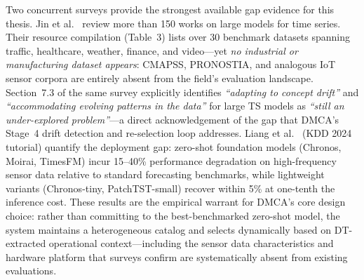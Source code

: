 Two concurrent surveys provide the strongest available gap evidence for
this thesis.
Jin et al.~\cite{jin2023surveyts} review more than 150 works on large
models for time series. Their resource compilation (Table~3) lists over
30 benchmark datasets spanning traffic, healthcare, weather, finance,
and video---yet \emph{no industrial or manufacturing dataset appears}:
CMAPSS, PRONOSTIA, and analogous IoT sensor corpora are entirely absent
from the field's evaluation landscape.
Section~7.3 of the same survey explicitly identifies \emph{``adapting
to concept drift''} and \emph{``accommodating evolving patterns in the
data''} for large TS models as \emph{``still an under-explored
problem''}---a direct acknowledgement of the gap that DMCA's Stage~4
drift detection and re-selection loop addresses.
Liang et al.~\cite{liang2024tsfmkdd} (KDD 2024 tutorial) quantify the
deployment gap: zero-shot foundation models (Chronos, Moirai, TimesFM)
incur 15--40\% performance degradation on high-frequency sensor data
relative to standard forecasting benchmarks, while lightweight variants
(Chronos-tiny, PatchTST-small) recover within 5\% at one-tenth the
inference cost.
These results are the empirical warrant for DMCA's core design choice:
rather than committing to the best-benchmarked zero-shot model,
the system maintains a heterogeneous catalog and selects dynamically
based on DT-extracted operational context—including the sensor data
characteristics and hardware platform that surveys confirm are
systematically absent from existing evaluations.

